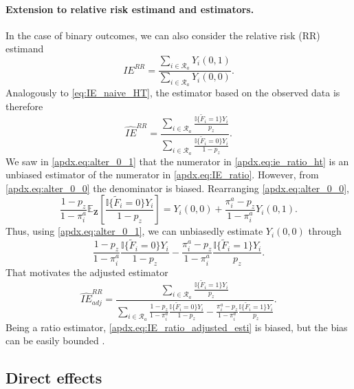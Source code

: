 \documentclass[11pt]{article}
\theoremstyle{definition}
\def \bZ {\boldsymbol{Z}}
\def \cR {\mathcal{R}}
\def \EX {\mathbb{E}}
\begin{document}
\paragraph{Extension to relative risk estimand and estimators.}
In the case of binary outcomes, we can also consider the relative risk (RR) estimand
\begin{equation}
    \label{apdx.eq:IE_ratio}
    IE^{RR} = \frac{
    \sum_{i \in \cR_a}Y_i(0,1)}{
    \sum_{i \in \cR_a}Y_i(0,0)
    }.
\end{equation}
Analogously to \eqref{eq:IE_naive_HT}, the estimator based on the observed data is therefore
\begin{equation}
    \label{apdx.eq:ie_ratio_ht}
    \widehat{IE}^{RR} =
    \frac{
    \sum_{i \in \cR_a}\frac{
    \mathbb{I}\{\widetilde{F}_i=1\}Y_i}{p_z}}{
    \sum_{i \in \cR_a}\frac{
    \mathbb{I}\{\widetilde{F}_i=0\}Y_i}{1 - p_z}
    }.
\end{equation}
We saw in \eqref{apdx.eq:alter_0_1} that the numerator in \eqref{apdx.eq:ie_ratio_ht} is an unbiased estimator of the numerator in \eqref{apdx.eq:IE_ratio}.
However, from \eqref{apdx.eq:alter_0_0} the denominator is biased. Rearranging \eqref{apdx.eq:alter_0_0}, 
\begin{equation*}
      \frac{1-p_z}{1-\pi_i^a}\EX_{\bZ}\left[\frac{
    \mathbb{I}\{\widetilde{F}_i=0\}Y_i}{1-p_z} \right]
    =
    Y_i(0,0) +
    \frac{\pi_i^a - p_z}{1-\pi_i^a}Y_i(0,1).
\end{equation*}
Thus, using \eqref{apdx.eq:alter_0_1}, we can unbiasedly estimate $Y_i(0,0)$ through
\begin{equation*}
     \frac{1-p_z}{1-\pi_i^a}
     \frac{
    \mathbb{I}\{\widetilde{F}_i=0\}Y_i}{1-p_z} -
     \frac{\pi_i^a - p_z}{1-\pi_i^a} \frac{
    \mathbb{I}\{\widetilde{F}_i=1\}Y_i}{p_z}.
\end{equation*}
That motivates the adjusted estimator
\begin{equation}
    \label{apdx.eq:IE_ratio_adjusted_esti}
    \widehat{IE}^{RR}_{adj} =
    \frac{
    \sum_{i \in \cR_a}\frac{
    \mathbb{I}\{\widetilde{F}_i=1\}Y_i}{p_z}}{
    \sum_{i \in \cR_a}\frac{1-p_z}{1-\pi_i^a}
     \frac{
    \mathbb{I}\{\widetilde{F}_i=0\}Y_i}{1-p_z} -
     \frac{\pi_i^a - p_z}{1-\pi_i^a} \frac{
    \mathbb{I}\{\widetilde{F}_i=1\}Y_i}{p_z}
    }.
\end{equation}
Being a ratio estimator, \eqref{apdx.eq:IE_ratio_adjusted_esti} is biased, but the bias can be easily bounded \citep{Saerndal2003}.

\subsection{Direct effects}
\end{document}
